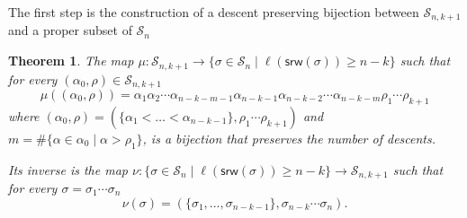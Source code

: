 \documentclass[a4paper]{amsart}
\newcommand{\srw}{\mathsf{srw}}
\newtheorem{theorem}{Theorem}[section]
\theoremstyle{definition}
\theoremstyle{remark}
\numberwithin{equation}{section}
\begin{document}
The first step is the construction of a descent preserving bijection between $\mathcal{S}_{n,k+1}$ and a proper subset of $\mathcal{S}_n$

\begin{theorem}\label{thm:bij_togli_par}
    The map $\mu:\mathcal{S}_{n,k+1}\to\{\sigma\in\mathcal{S}_n\mid \ell(\srw(\sigma))\geq n-k\}$ such that for every $(\alpha_0,\rho)\in\mathcal{S}_{n,k+1}$
    \begin{equation}
        \mu((\alpha_0,\rho))=\alpha_1\alpha_2\cdots\alpha_{n-k-m-1}\alpha_{n-k-1}\alpha_{n-k-2}\cdots\alpha_{n-k-m}\rho_1\cdots\rho_{k+1}
    \end{equation}
    where $(\alpha_0,\rho)=(\{\alpha_1<\dots<\alpha_{n-k-1}\},\rho_1\cdots\rho_{k+1})$ and $m=\#\{\alpha\in\alpha_0\mid\alpha>\rho_1\}$, is a bijection that preserves the number of descents.

    Its inverse is the map $\nu:\{\sigma\in\mathcal{S}_n\mid \ell(\srw(\sigma))\geq n-k\}\to\mathcal{S}_{n,k+1}$ such that for every $\sigma=\sigma_1\cdots\sigma_n$
    \begin{equation}
        \nu(\sigma)=(\{\sigma_1,\dots,\sigma_{n-k-1}\},\sigma_{n-k}\cdots\sigma_n).
    \end{equation}
\end{theorem}
\end{document}
